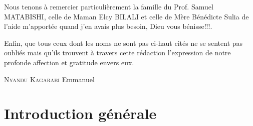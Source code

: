 \documentclass[11pt,a4paper,oneside]{book}
\begin{document}
\par Nous tenons à remercier particulièrement la famille du Prof. Samuel MATABISHI, celle de Maman Elcy BILALI et celle de Mère Bénédicte Sulia de l'aide m'apportée quand j'en avais plus besoin, Dieu vous bénisse!!!.\\
\par Enfin, que tous ceux dont les noms ne sont pas ci-haut cités ne se sentent pas
oubliés mais qu’ils trouvent à travers cette rédaction l’expression de notre profonde
affection et gratitude envers eux.\begin{flushright}
	 \textsc{Nyandu Kagarabi} Emmanuel
\end{flushright}



\mainmatter
\chapter*{Introduction générale}
%
\end{document}
